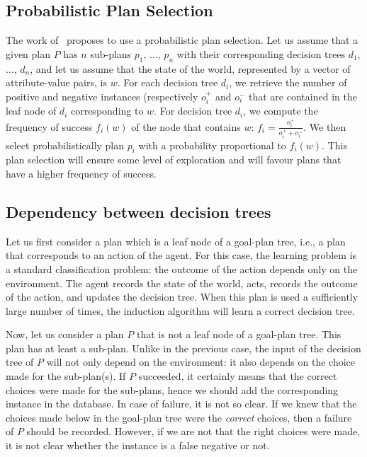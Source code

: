 \documentclass{article}
\begin{document}
\subsection{Probabilistic Plan Selection}

The work of~\cite{Singh10:Learning} proposes to use a probabilistic
plan selection. Let us assume that a given plan $P$ has $n$ sub-plans
$p_1$, $\dots$, $p_n$ with their corresponding decision trees $d_1$,
$\dots$, $d_n$, and let us assume that the state of the world,
represented by a vector of attribute-value pairs, is $w$. For each
decision tree $d_i$, we retrieve the number of positive and negative
instances (respectively $o^+_i$ and $o^-_i$ that are contained in the
leaf node of $d_i$ corresponding to $w$. For decision tree $d_i$, we
compute the frequency of success $f_i(w)$ of the node that contains
$w$: $f_i=\frac{o^+_i}{o^+_i + o^-_i}$.  We then select
probabilistically plan $p_i$ with a probability proportional to
$f_i(w)$. This plan selection will ensure some level of exploration and
will favour plans that have a higher frequency of success.


\subsection{Dependency between decision trees}

Let us first consider a plan which is a leaf node of a goal-plan tree,
i.e., a plan that corresponds to an action of the agent. For this
case, the learning problem is a standard classification problem: the
outcome of the action depends only on the environment.  The agent
records the state of the world, acts, records the outcome of the
action, and updates the decision tree. When this plan is used a
sufficiently large number of times, the induction algorithm will learn
a correct decision tree.

Now, let us consider a plan $P$ that is not a leaf node of a goal-plan
tree. This plan has at least a sub-plan. Unlike in the previous case,
the input of the decision tree of $P$ will not only depend on the
environment: it also depends on the choice made for the
sub-plan(s). If $P$ succeeded, it certainly means that the correct
choices were made for the sub-plans, hence we should add the
corresponding instance in the database. In case of failure, it is not
so clear. If we knew that the choices made below in the goal-plan tree
were the \emph{correct} choices, then a failure of $P$ should be
recorded. However, if we are not that the right choices were made, it
is not clear whether the instance is a false negative or not.
\end{document}
